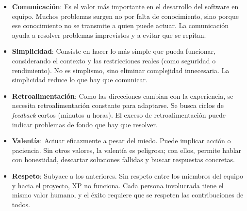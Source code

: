 \begin{itemize}
      \item \textbf{Comunicación}: Es el valor más importante en el desarrollo
            del software en equipo. Muchos problemas  surgen  no  por  falta  de
            conocimiento, sino porque ese conocimiento no se transmite  a  quien
            puede actuar. La comunicación ayuda a resolver problemas imprevistos
            y a evitar que se repitan.

      \item \textbf{Simplicidad}: Consiste en hacer lo más simple que pueda
            funcionar, considerando el contexto y las restricciones reales (como
            seguridad o rendimiento). No es simplismo, sino eliminar complejidad
            innecesaria. La simplicidad reduce lo que hay que comunicar.

      \item \textbf{Retroalimentación}: Como las direcciones cambian con la
            experiencia, se necesita retroalimentación constante para adaptarse.
            Se busca ciclos de \textit{feedback} cortos (minutos  u  horas).  El
            exceso de retroalimentación puede indicar problemas de fondo que hay
            que resolver.

      \item \textbf{Valentía}: Actuar eficazmente a pesar del miedo. Puede
            implicar acción o paciencia.  Sin  otros  valores,  la  valentía  es
            peligrosa; con  ellos,  permite  hablar  con  honestidad,  descartar
            soluciones fallidas y buscar respuestas concretas.

      \item \textbf{Respeto}: Subyace a los anteriores. Sin respeto entre los
            miembros del equipo y  hacia  el  proyecto,  XP  no  funciona.  Cada
            persona involucrada tiene el mismo valor humano, y el éxito requiere
            que se respeten las contribuciones de todos.
\end{itemize}